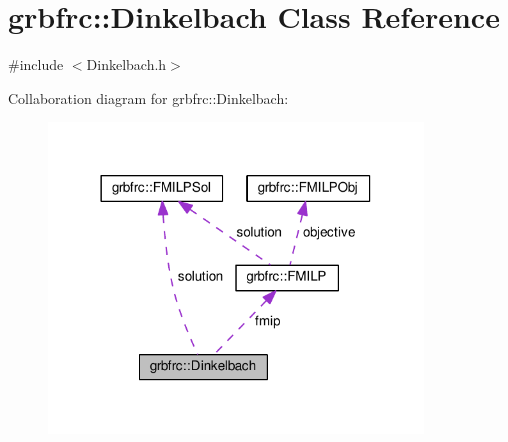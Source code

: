 \hypertarget{classgrbfrc_1_1Dinkelbach}{}\section{grbfrc\+:\+:Dinkelbach Class Reference}
\label{classgrbfrc_1_1Dinkelbach}


{\ttfamily \#include $<$Dinkelbach.\+h$>$}



Collaboration diagram for grbfrc\+:\+:Dinkelbach\+:
\nopagebreak
\begin{figure}[H]
\begin{center}
\leavevmode
\includegraphics[width=282pt]{classgrbfrc_1_1Dinkelbach__coll__graph}
\end{center}
\end{figure}
